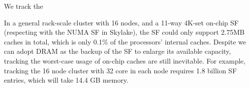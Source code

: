 



\ifx\undefined\stale
We track the 

In a general rack-scale cluster with 16 nodes, and a 11-way 4K-set on-chip SF (respecting with the NUMA SF in Skylake), the SF could only support 2.75MB caches in total, which is only 0.1\% of the processors' internal caches.
Despite we can adopt DRAM as the backup of the SF to enlarge its available capacity, tracking the worst-case usage of on-chip caches are still inevitable. For example, tracking the 16 node cluster with 32 core in each node requires 1.8 billion SF entries, which will take 14.4 GB memory. 
\fi

